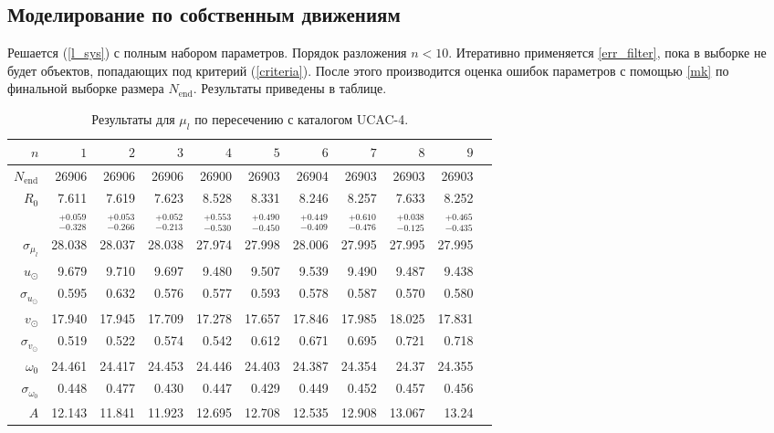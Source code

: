 \documentclass{matmex-diploma-custom}
\begin{document}
\subsection{Моделирование по собственным движениям} \label{mu_res}
Решается (\ref{l_sys}) с полным набором параметров. Порядок разложения $n < 10$. Итеративно применяется \ref{err_filter}, пока в выборке не будет объектов, попадающих под критерий (\ref{criteria}). После этого производится оценка ошибок параметров с помощью \ref{mk} по финальной выборке размера $N_{\mathrm{end}}$. Результаты приведены в таблице. 
\begin{table}[h!!]
\centering
\caption{Результаты для $\mu_l$ по пересечению с каталогом UCAC-4.}
\begin{tabular}{r|rrr|rr|rrrrr}
\hline
$n$ & $1$ & $2$ & $3$ & $4$ & $5$&$ 6 $&$ 7 $&$ 8 $&$ 9 $\\\hline
 $N_{\mathrm{end}}$ & 26906       &   26906 &   26906 &   26900 &   26903 &   26904 &   26903 &   26903 &   26903 \\
 $R_0 $& 7.611       &   7.619 &   7.623 &   8.528 &   8.331 &   8.246 &   8.257 &   7.633 &   8.252 \\
       & $_{-0.328}^{+0.059} $ & $_{-0.266}^{+0.053}$ & $_{-0.213}^{+0.052}$   & $_{-0.530}^{+0.553}$  & $_{-0.450}^{+0.490}$  & $_{-0.409}^{+0.449}$  & $_{-0.476}^{+0.610}$  & $_{-0.125}^{+0.038}$  & $_{-0.435}^{+0.465}$  \\\hline
 $\sigma_{\mu_l} $& 28.038      &  28.037 &  28.038 &  27.974 &  27.998 &  28.006 &  27.995 &  27.995 &  27.995 \\
 $ u_{\odot} $& 9.679       &    9.710 &   9.697 &    9.480 &   9.507 &   9.539 &    9.490 &   9.487 &   9.438 \\
 $\sigma_{u_{\odot}} $&0.595       &   0.632 &   0.576 &   0.577 &   0.593 &   0.578 &   0.587 &    0.570 &    0.580 \\
 $v_{\odot} $& 17.940      &  17.945 &  17.709 &  17.278 &  17.657 &  17.846 &  17.985 &  18.025 &  17.831 \\
 $\sigma_{v_{\odot}}$&0.519       &   0.522 &   0.574 &   0.542 &   0.612 &   0.671 &   0.695 &   0.721 &   0.718 \\
 $\omega_0 $&24.461      &  24.417 &  24.453 &  24.446 &  24.403 &  24.387 &  24.354 &   24.37 &  24.355 \\
 $\sigma_{\omega_0} $& 0.448       &   0.477 &    0.430 &   0.447 &   0.429 &   0.449 &   0.452 &   0.457 &   0.456 \\\hline
 $A $&12.143      &  11.841 &  11.923 &  12.695 &  12.708 &  12.535 &  12.908 &  13.067 &   13.24 \\

\end{tabular}
\end{table}
\end{document}
